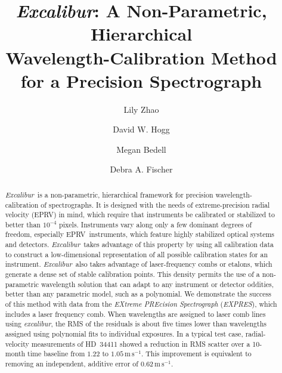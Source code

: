 \documentclass[modern]{aastex63}
\newcommand{\project}[1]{\textsl{#1}}
\newcommand{\name}{\project{excalibur}}
\newcommand{\Name}{\project{Excalibur}}
\newcommand{\acronym}[1]{{\small{#1}}}
\newcommand{\expres}{\project{\acronym{EXPRES}}}
\newcommand{\eprv}{\acronym{EPRV}}
\newcommand{\mps}{\mathrm{m\,s^{-1}}}
\begin{document}
\title{\Name:
  A Non-Parametric, Hierarchical \\
  Wavelength-Calibration Method for a Precision Spectrograph}


\author[0000-0002-3852-3590]{Lily Zhao}

\author[0000-0003-2866-9403]{David W. Hogg}

\author[0000-0001-9907-7742]{Megan Bedell}

\author[0000-0003-2221-0861]{Debra A. Fischer}

\begin{abstract}\noindent%
\Name\ is a non-parametric, hierarchical framework for precision wavelength-calibration of spectrographs.  It is designed with the needs of extreme-precision radial velocity (\eprv) in mind, which require that instruments be calibrated or stabilized to better than $10^{-4}$ pixels.  Instruments vary along only a few dominant degrees of freedom, especially \eprv\ instruments, which feature highly stabilized optical systems and detectors.  \Name\ takes advantage of this property by using all calibration data to construct a low-dimensional representation of all possible calibration states for an instrument.  \Name\ also takes advantage of laser-frequency combs or etalons, which generate a dense set of stable calibration points.  This density permits the use of a non-parametric wavelength solution that can adapt to any instrument or detector oddities, better than any parametric model, such as a polynomial.  We demonstrate the success of this method with data from the \textsl{EXtreme PREcision Spectrograph} (\expres), which includes a laser frequency comb.  When wavelengths are assigned to laser comb lines using \name, the RMS of the residuals is about five times lower than wavelengths assigned using polynomial fits to individual exposures.  In a typical test case, radial-velocity measurements of HD~34411 showed a reduction in RMS scatter over a 10-month time baseline from $1.22$ to $1.05\, \mps$.  This improvement is equivalent to removing an independent, additive error of $0.62\, \mps$.
\end{abstract}
\end{document}
